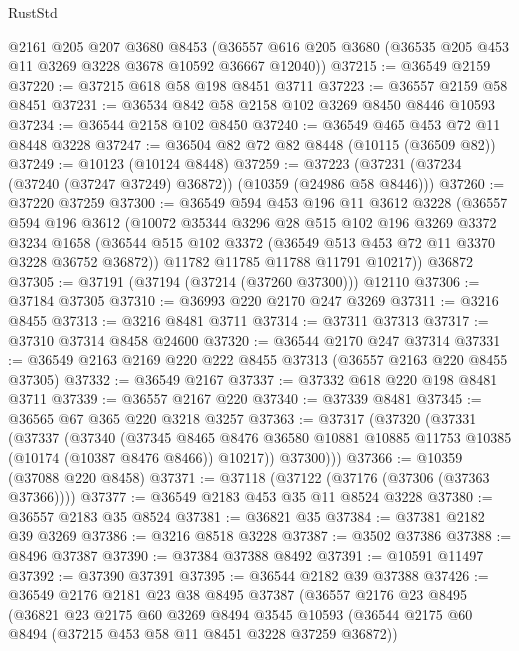 \begin{lexlean}{RustStd}
\begin{coremodule}
    @2161
    @205
    @207
    @3680
    @8453
    (@36557 @616 @205 @3680 (@36535 @205 @453 @11 @3269 @3228 @3678 @10592 @36667 @12040))
@37215 := @36549 @2159
@37220 := @37215 @618 @58 @198 @8451 @3711
@37223 := @36557 @2159 @58 @8451
@37231 := @36534 @842 @58 @2158 @102 @3269 @8450 @8446 @10593
@37234 := @36544 @2158 @102 @8450
@37240 := @36549 @465 @453 @72 @11 @8448 @3228
@37247 := @36504 @82 @72 @82 @8448 (@10115 (@36509 @82))
@37249 := @10123 (@10124 @8448)
@37259 := @37223 (@37231 (@37234 (@37240 (@37247 @37249) @36872)) (@10359 (@24986 @58 @8446)))
@37260 := @37220 @37259
@37300 := @36549
    @594
    @453
    @196
    @11
    @3612
    @3228
    (@36557
      @594
      @196
      @3612
      (@10072
        @35344
        @3296
        @28
        @515
        @102
        @196
        @3269
        @3372
        @3234
        @1658
        (@36544 @515 @102 @3372 (@36549 @513 @453 @72 @11 @3370 @3228 @36752 @36872))
        @11782
        @11785
        @11788
        @11791
        @10217))
    @36872
@37305 := @37191 (@37194 (@37214 (@37260 @37300))) @12110
@37306 := @37184 @37305
@37310 := @36993 @220 @2170 @247 @3269
@37311 := @3216 @8455
@37313 := @3216 @8481 @3711
@37314 := @37311 @37313
@37317 := @37310 @37314 @8458 @24600
@37320 := @36544 @2170 @247 @37314
@37331 := @36549 @2163 @2169 @220 @222 @8455 @37313 (@36557 @2163 @220 @8455 @37305)
@37332 := @36549 @2167
@37337 := @37332 @618 @220 @198 @8481 @3711
@37339 := @36557 @2167 @220
@37340 := @37339 @8481
@37345 := @36565 @67 @365 @220 @3218 @3257
@37363 := @37317
    (@37320
      (@37331
        (@37337
          (@37340
            (@37345
              @8465
              @8476
              @36580
              @10881
              @10885
              @11753
              @10385
              (@10174 (@10387 @8476 @8466))
              @10217))
          @37300)))
@37366 := @10359 (@37088 @220 @8458)
@37371 := @37118 (@37122 (@37176 (@37306 (@37363 @37366))))
@37377 := @36549 @2183 @453 @35 @11 @8524 @3228
@37380 := @36557 @2183 @35 @8524
@37381 := @36821 @35
@37384 := @37381 @2182 @39 @3269
@37386 := @3216 @8518 @3228
@37387 := @3502 @37386
@37388 := @8496 @37387
@37390 := @37384 @37388 @8492
@37391 := @10591 @11497
@37392 := @37390 @37391
@37395 := @36544 @2182 @39 @37388
@37426 := @36549
    @2176
    @2181
    @23
    @38
    @8495
    @37387
    (@36557
      @2176
      @23
      @8495
      (@36821
        @23
        @2175
        @60
        @3269
        @8494
        @3545
        @10593
        (@36544 @2175 @60 @8494 (@37215 @453 @58 @11 @8451 @3228 @37259 @36872))

\end{coremodule}
\end{lexlean}

